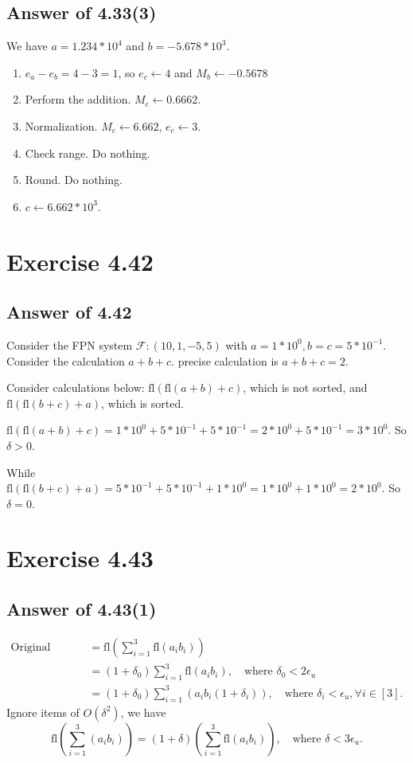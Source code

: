 \documentclass[a4paper]{article}
\begin{document}
\subsection*{Answer of 4.33(3)}
We have $a=1.234*10^4$ and $b=-5.678*10^3$.

\begin{enumerate}[label=(\roman*)] 
    \item $e_a-e_b=4-3=1$, so $e_c \gets 4$ and $M_b \gets -0.5678$
    \item Perform the addition. $M_c \gets 0.6662$.
    \item Normalization. $M_c \gets 6.662$, $e_c \gets 3$.
    \item Check range. Do nothing.
    \item Round. Do nothing.
    \item $c \gets 6.662 * 10^3$.
\end{enumerate}

\section*{Exercise 4.42}

\subsection*{Answer of 4.42}
Consider the FPN system $\mathcal{F}:(10,1,-5,5)$ with $a=1*10^0,b=c=5*10^{-1}$.
Consider the calculation $a+b+c$. precise calculation is $a+b+c=2$.

Consider calculations below: $\text{fl}(\text{fl}(a+b)+c)$, which is not sorted, and $\text{fl}(\text{fl}(b+c)+a)$, which is sorted.

$\text{fl}(\text{fl}(a+b)+c)=1*10^0+5*10^{-1}+5*10^{-1}=2*10^0+5*10^{-1}=3*10^0$. So $\delta>0$.

While $\text{fl}(\text{fl}(b+c)+a)=5*10^{-1}+5*10^{-1}+1*10^0=1*10^0+1*10^0=2*10^0$. So $\delta=0$.

\section*{Exercise 4.43}

\subsection*{Answer of 4.43(1)}
\begin{align*}
    \text{Original formula}&=\text{fl}(\sum_{i=1}^{3} \text{fl}(a_ib_i))\\
    &=(1+\delta_0)\sum_{i=1}^{3} \text{fl}(a_ib_i),\quad \text{where } \delta_0<2\epsilon_u\\
    &=(1+\delta_0)\sum_{i=1}^{3} (a_ib_i(1+\delta_i)),\quad \text{where } \delta_i<\epsilon_u, \forall i \in [3].
\end{align*}
Ignore items of $O(\delta^2)$, we have $$\text{fl}(\sum_{i=1}^{3} (a_ib_i))=(1+\delta)(\sum_{i=1}^{3} \text{fl}(a_ib_i)),\quad \text{where } \delta<3\epsilon_u.$$
\end{document}
